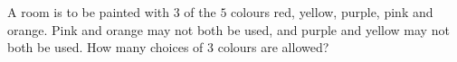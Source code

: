A room is to be painted with $3$ of the $5$ colours red, yellow, purple, pink and orange. Pink and orange may not both be used, and purple and yellow may not both be used. How many choices of $3$ colours are allowed?
